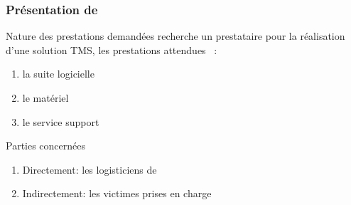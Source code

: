  \begin{frame}
 \frametitle {Présentation de \mo}
 \begin{block}{Nature des prestations demandées}
 \mo recherche  un prestataire pour la réalisation d'une solution TMS, les prestations attendues ~:
 \begin{enumerate}
 \item la suite logicielle \pause
 \item le matériel \pause
 \item le service support
 \end{enumerate}
 \end{block} \pause
 \begin{block}{Parties concernées}
 \begin{enumerate}
 \item Directement: les logisticiens de \mo
 \item Indirectement: les victimes prises en charge
 \end{enumerate}
 \end{block}
 \end{frame}